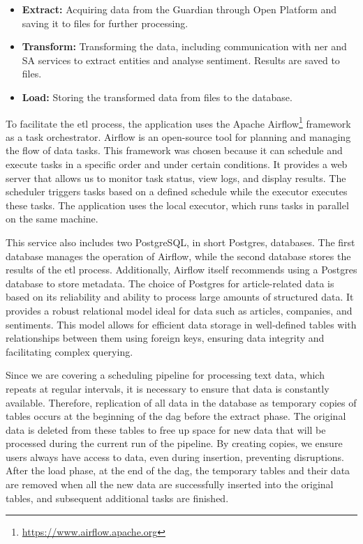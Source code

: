 \begin{itemize}
\item \textbf{Extract:} Acquiring data from the Guardian through Open Platform and saving it to files for further processing.
\item \textbf{Transform:} Transforming the data, including communication with \acrshort{ner} and SA services to extract entities and analyse sentiment. Results are saved to files.
\item \textbf{Load:} Storing the transformed data from files to the database.
\end{itemize}

To facilitate the \acrshort{etl} process, the application uses the Apache Airflow\footnote{\href{https://www.airflow.apache.org}{https://www.airflow.apache.org}} framework as a task orchestrator. Airflow is an open-source tool for planning and managing the flow of data tasks. This framework was chosen because it can schedule and execute tasks in a specific order and under certain conditions. It provides a web server that allows us to monitor task status, view logs, and display results. The scheduler triggers tasks based on a defined schedule while the executor executes these tasks. The application uses the local executor, which runs tasks in parallel on the same machine.

This service also includes two PostgreSQL, in short Postgres, databases. The first database manages the operation of Airflow, while the second database stores the results of the \acrshort{etl} process. Additionally, Airflow itself recommends using a Postgres database to store metadata. The choice of Postgres for article-related data is based on its reliability and ability to process large amounts of structured data. It provides a robust relational model ideal for data such as articles, companies, and sentiments. This model allows for efficient data storage in well-defined tables with relationships between them using foreign keys, ensuring data integrity and facilitating complex querying.

Since we are covering a scheduling pipeline for processing text data, which repeats at regular intervals, it is necessary to ensure that data is constantly available. Therefore, replication of all data in the database as temporary copies of tables occurs at the beginning of the \acrfull{dag} before the extract phase. The original data is deleted from these tables to free up space for new data that will be processed during the current run of the pipeline. By creating copies, we ensure users always have access to data, even during insertion, preventing disruptions. After the load phase, at the end of the \acrshort{dag}, the temporary tables and their data are removed when all the new data are successfully inserted into the original tables, and subsequent additional tasks are finished.


